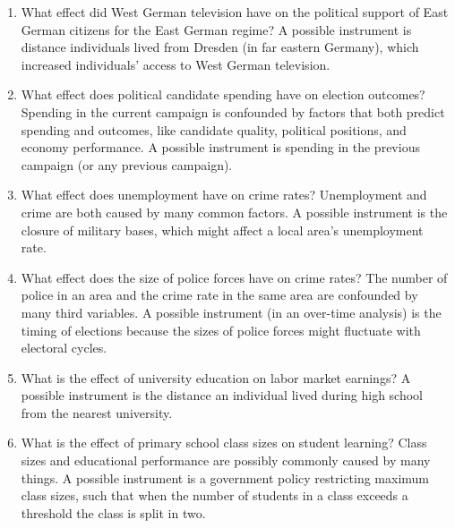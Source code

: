 \documentclass[a4paper,12pt]{article}
\begin{document}
\begin{enumerate}
\item What effect did West German television have on the political support of East German citizens for the East German regime? A possible instrument is distance individuals lived from Dresden (in far eastern Germany), which increased individuals' access to West German television. %

\item What effect does political candidate spending have on election outcomes? Spending in the current campaign is confounded by factors that both predict spending and outcomes, like candidate quality, political positions, and economy performance. A possible instrument is spending in the previous campaign (or any previous campaign). %

\item What effect does unemployment have on crime rates? Unemployment and crime are both caused by many common factors. A possible instrument is the closure of military bases, which might affect a local area's unemployment rate. %

\item What effect does the size of police forces have on crime rates? The number of police in an area and the crime rate in the same area are confounded by many third variables. A possible instrument (in an over-time analysis) is the timing of elections because the sizes of police forces might fluctuate with electoral cycles. %

\item What is the effect of university education on labor market earnings? A possible instrument is the distance an individual lived during high school from the nearest university. %

\item What is the effect of primary school class sizes on student learning? Class sizes and educational performance are possibly commonly caused by many things. A possible instrument is a government policy restricting maximum class sizes, such that when the number of students in a class exceeds a threshold the class is split in two. %



\end{enumerate}
\end{document}
